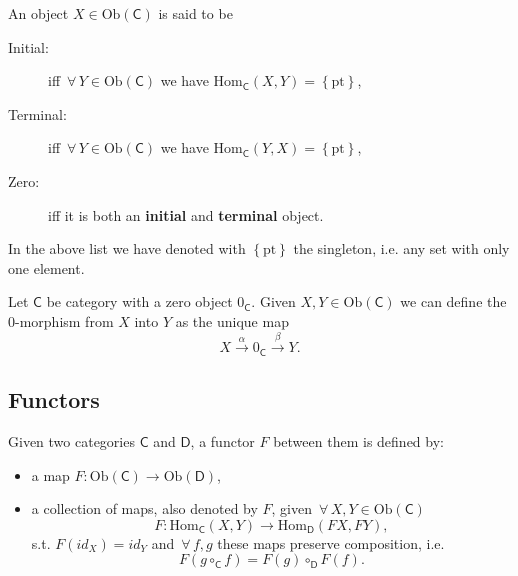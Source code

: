 \begin{defn}
	An object $X \in \mathrm{Ob} \left(\mathsf{C}\right)$ is said to be
	\begin{description}
		\item[Initial:] iff $\,\forall\, Y \in \mathrm{Ob} \left(\mathsf{C}\right)$ we have $\mathrm{Hom}_{\mathsf{C}} \left( X, Y \right) = \left\{ \mathrm{pt} \right\}$,
		\item[Terminal:] iff $\,\forall\, Y \in \mathrm{Ob} \left(\mathsf{C}\right)$ we have $\mathrm{Hom}_{\mathsf{C}} \left( Y, X \right) = \left\{ \mathrm{pt} \right\}$,
		\item[Zero:] iff it is both an \textbf{initial} and \textbf{terminal} object.
	\end{description} 
	In the above list we have denoted with $\left\{ \mathrm{pt} \right\}$ the singleton, i.e. any set with only one element.
\end{defn}

\begin{defn}
	Let $\mathsf{C}$ be category with a zero object $0_{\mathsf{C}}$.
	Given $X, Y \in \mathrm{Ob} \left(\mathsf{C}\right)$ we can define the
	$0$-morphism from $X$ into $Y$ as the unique map
	\begin{equation}
		X \xrightarrow{\alpha} 0_{\mathsf{C}} \xrightarrow{\beta} Y
	.\end{equation} 
\end{defn}

\subsection{Functors}

\begin{defn}[Functor]
	Given two categories $\mathsf{C}$ and $\mathsf{D}$, a functor $F$ between them is defined by:
	\begin{itemize}
		\item a map $F: \mathrm{Ob} \left(\mathsf{C}\right) \to \mathrm{Ob} \left(\mathsf{D}\right)$,
		\item a collection of maps, also denoted by $F$, given $\,\forall\, X,Y \in \mathrm{Ob} \left(\mathsf{C}\right)$
			\begin{equation}
			F: \mathrm{Hom}_{\mathsf{C}} \left( X, Y \right) \to \mathrm{Hom}_{\mathsf{D}} \left( FX, FY \right) 
			,\end{equation} 
			s.t. $F(id_X) = id_Y$ and $\,\forall\, f,g$ these maps preserve composition, i.e. 
			\begin{equation}
			 F \left( g \circ_{\mathsf{C}} f \right) = F(g) \circ_{\mathsf{D}} F(f)
			.\end{equation}
	\end{itemize}
\end{defn}

